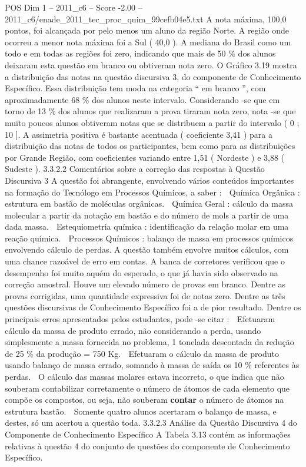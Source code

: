 \begin{textsample}{POS Dim 1 – 2011\_c6 – Score -2.00 – 2011\_c6/enade\_2011\_tec\_proc\_quim\_99cefb04e5.txt}
A nota máxima, 100,0 pontos, foi alcançada por pelo menos um aluno da região Norte.
A região onde ocorreu a menor nota máxima foi a Sul ( 40,0 ).
A mediana do Brasil como um todo e em todas as regiões foi zero, indicando que mais de 50 \% dos alunos deixaram esta questão em branco ou obtiveram nota zero.
O Gráfico 3.19 mostra a distribuição das notas na questão discursiva 3, do componente de Conhecimento Específico.
Essa distribuição tem moda na categoria “ em branco ”, com aproximadamente 68 \% dos alunos neste intervalo.
Considerando -se que em torno de 13 \% dos alunos que realizaram a prova tiraram nota zero, nota -se que muito poucos alunos obtiveram notas que se distribuem a partir do intervalo ( 0 ; 10 ].
A assimetria positiva é bastante acentuada ( coeficiente 3,41 ) para a distribuição das notas de todos os participantes, bem como para as distribuições por Grande Região, com coeficientes variando entre 1,51 ( Nordeste ) e 3,88 ( Sudeste ). 3.3.2.2 Comentários sobre a correção das respostas à Questão Discursiva 3 A questão foi abrangente, envolvendo vários conteúdos importantes na formação do Tecnólogo em Processos Químicos, a saber :  Química Orgânica : estrutura em bastão de moléculas orgânicas.  Química Geral : cálculo da massa molecular a partir da notação em bastão e do número de mols a partir de uma dada massa.  Estequiometria química : identificação da relação molar em uma reação química.  Processos Químicos : balanço de massa em processos químicos envolvendo cálculo de perdas.
A questão também envolve muitos cálculos, com uma chance razoável de erro em contas.
A banca de corretores verificou que o desempenho foi muito aquém do esperado, o que já havia sido observado na correção amostral.
Houve um elevado número de provas em branco.
Dentre as provas corrigidas, uma quantidade expressiva foi de notas zero.
Dentre as três questões discursivas de Conhecimento Específico foi a de pior resultado.
Dentre os principais erros apresentados pelos estudantes, pode -se citar :  Efetuaram cálculo da massa de produto errado, não considerando a perda, usando simplesmente a massa fornecida no problema, 1 tonelada descontada da redução de 25 \% da produção = 750 Kg.  Efetuaram o cálculo da massa de produto usando balanço de massa errado, somando à massa de saída os 10 \% referentes às perdas.  O cálculo das massas molares estava incorreto, o que indica que não souberam contabilizar corretamente o número de átomos de cada elemento que compõe os compostos, ou seja, não souberam \textbf{contar} o número de átomos na estrutura bastão.  Somente quatro alunos acertaram o balanço de massa, e destes, só um acertou a questão toda. 3.3.2.3 Análise da Questão Discursiva 4 do Componente de Conhecimento Específico A Tabela 3.13 contém as informações relativas à questão 4 do conjunto de questões do componente de Conhecimento Específico.

\end{textsample}
